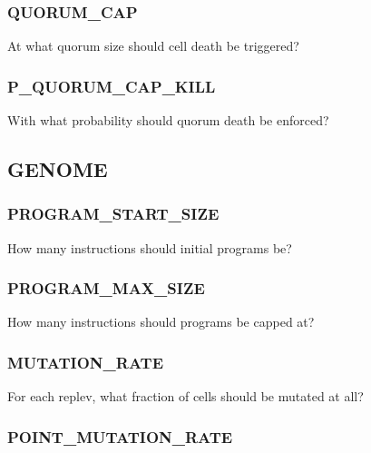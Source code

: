 
\subsubsection{QUORUM\_CAP}


At what quorum size should cell death be triggered?

\subsubsection{P\_QUORUM\_CAP\_KILL}


With what probability should quorum death be enforced?


\subsection{GENOME}

\subsubsection{PROGRAM\_START\_SIZE}


How many instructions should initial programs be?

\subsubsection{PROGRAM\_MAX\_SIZE}


How many instructions should programs be capped at?

\subsubsection{MUTATION\_RATE}


For each replev, what fraction of cells should be mutated at all?

\subsubsection{POINT\_MUTATION\_RATE}

